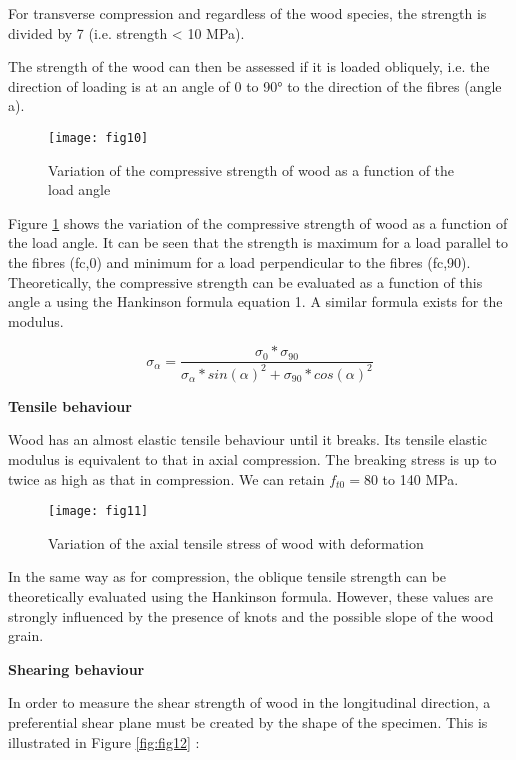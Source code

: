 For transverse compression and regardless of the wood species, the strength is divided by 7 (i.e. strength < 10 MPa). 

The strength of the wood can then be assessed if it is loaded obliquely, i.e. the direction of loading is at an angle of 0 to 90° to the direction of the fibres (angle a). 

\graphicspath{{Images/}}
\begin{figure}[htp]
	\centering
	\texttt{[image: fig10]}
	\caption{Variation of the compressive strength of wood as a function of the load angle}
	\label{fig:fig10}
\end{figure}

Figure \ref{fig:fig10} shows the variation of the compressive strength of wood as a function of the load angle. It can be seen that the strength is maximum for a load parallel to the fibres (fc,0) and minimum for a load perpendicular to the fibres (fc,90). Theoretically, the compressive strength can be evaluated as a function of this angle a using the Hankinson formula equation 1. A similar formula exists for the modulus.

\begin{equation}
	\sigma_{\alpha} = \frac{\sigma_{0}*\sigma_{90}}{\sigma_{\alpha}*sin(\alpha)^2+\sigma_{90}*cos(\alpha)^2}
\end{equation}

\textbf{Tensile behaviour}

Wood has an almost elastic tensile behaviour until it breaks. Its tensile elastic modulus is equivalent to that in axial compression. The breaking stress is up to twice as high as that in compression. We can retain $f_{t0}=80$ to 140 MPa.

\graphicspath{{Images/}}
\begin{figure}[htp]
	\centering
	\texttt{[image: fig11]}
	\caption{Variation of the axial tensile stress of wood with deformation}
	\label{fig:galaxy}
\end{figure}

In the same way as for compression, the oblique tensile strength can be theoretically evaluated using the Hankinson formula. However, these values are strongly influenced by the presence of knots and the possible slope of the wood grain.

\smallskip

\textbf{Shearing behaviour}

In order to measure the shear strength of wood in the longitudinal direction, a preferential shear plane must be created by the shape of the specimen. This is illustrated in Figure \ref{fig:fig12} :

